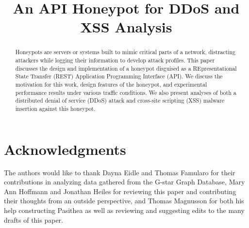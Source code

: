\documentclass[10pt, conference]{IEEEtran}
\begin{document}
%
\title{An API Honeypot for DDoS and XSS Analysis}


\author{
}


\maketitle


\begin{abstract}
Honeypots are servers or systems built to mimic critical parts of a network, distracting attackers while logging their information to develop attack profiles. 
This paper discusses the design and implementation of a honeypot disguised as a REpresentational State Transfer (REST) Application Programming Interface (API). 
We discuss the motivation for this work, design features of the honeypot, and experimental performance results under various traffic conditions.  
We also present analyses of both a distributed denial of service (DDoS) attack and cross-site scripting (XSS) malware insertion against this honeypot.
\end{abstract}








\section*{Acknowledgments} \label{Acknowledgements}
The authors would like to thank Dayna Eidle and Thomas Famularo for their contributions in analyzing data gathered from the G-star Graph Database, Mary Ann Hoffmann and Jonathan Heiles for reviewing this paper and contributing their thoughts from an outside perspective, and Thomas Magnusson for both his help constructing Pasithea as well as reviewing and suggesting edits to the many drafts of this paper.
\end{document}
